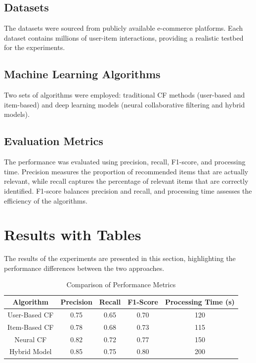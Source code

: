 \documentclass{article}
\begin{document}
\subsection{Datasets}
The datasets were sourced from publicly available e-commerce platforms. Each dataset contains millions of user-item interactions, providing a realistic testbed for the experiments.

\subsection{Machine Learning Algorithms}
Two sets of algorithms were employed: traditional CF methods (user-based and item-based) and deep learning models (neural collaborative filtering and hybrid models).

\subsection{Evaluation Metrics}
The performance was evaluated using precision, recall, F1-score, and processing time. Precision measures the proportion of recommended items that are actually relevant, while recall captures the percentage of relevant items that are correctly identified. F1-score balances precision and recall, and processing time assesses the efficiency of the algorithms.

\section{Results with Tables}
The results of the experiments are presented in this section, highlighting the performance differences between the two approaches.

\begin{table}[ht]
\centering
\begin{tabular}{|c|c|c|c|c|}
\hline
\textbf{Algorithm} & \textbf{Precision} & \textbf{Recall} & \textbf{F1-Score} & \textbf{Processing Time (s)} \\
\hline
User-Based CF & 0.75 & 0.65 & 0.70 & 120 \\
Item-Based CF & 0.78 & 0.68 & 0.73 & 115 \\
Neural CF & 0.82 & 0.72 & 0.77 & 150 \\
Hybrid Model & 0.85 & 0.75 & 0.80 & 200 \\
\hline
\end{tabular}
\caption{Comparison of Performance Metrics}
\label{tab:performance}
\end{table}
\end{document}
